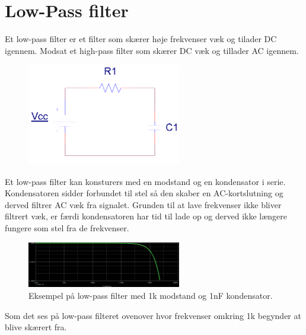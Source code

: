 \section{Low-Pass filter}

Et low-pass filter er et filter som skærer høje frekvenser væk og tilader DC igennem. Modsat et high-pass filter som skærer DC væk og tillader AC igennem. 

\begin{figure}[h!]
  \centering
  \includegraphics[width=0.6\textwidth]{figures/low_pass_schematic.png}
\end{figure}

Et low-pass filter kan konsturers med en modstand og en kondensator i serie. Kondensatoren sidder forbundet til stel så den skaber en AC-kortslutning og derved filtrer AC væk fra signalet. Grunden til at lave frekvenser ikke bliver filtrert væk, er færdi kondensatoren har tid til lade op og derved ikke længere fungere som stel fra de frekvenser.

\begin{figure}[h!]
  \centering
  \includegraphics[width=0.6\textwidth]{figures/low_pass_cut_off_frequency.png}
  \caption{Eksempel på low-pass filter med 1k modstand og 1nF kondensator.}
\end{figure}
Som det ses på low-pass filteret ovenover hvor frekvenser omkring 1k begynder at blive skærert fra.
